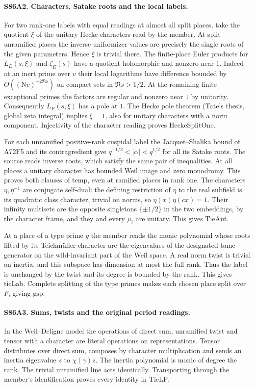 \paragraph{S86A2. Characters, Satake roots and the local labels.}
For two rank-one labels with equal readings at almost all split places,
take the quotient $\xi$ of the unitary Hecke characters read by the member.
At split unramified places the inverse uniformizer values are precisely
the single roots of the given parameters. Hence $\xi$ is trivial there.
The finite-place Euler products for $L_E(s,\xi)$ and $\zeta_E(s)$ have a
quotient holomorphic and nonzero near $1$. Indeed at an inert prime
over $v$ their local logarithms have difference bounded by
$O((\mathrm Nv)^{-2\Re s})$ on compact sets in $\Re s>1/2$.
At the remaining finite exceptional primes the factors are regular and
nonzero near $1$ by unitarity. Consequently $L_E(s,\xi)$ has a pole
at $1$. The Hecke pole theorem (Tate's thesis, global zeta integral)
implies $\xi=1$, also for unitary characters with a norm component.
Injectivity of the character reading proves $\mathrm{HeckeSplitOne}$.

For each unramified positive-rank cuspidal label the Jacquet--Shalika
bound of A72F5 and its contragredient give
$q^{-1/2}<|\alpha|<q^{1/2}$ for all its Satake roots. The source
reads inverse roots, which satisfy the same pair of inequalities.
At all places a unitary character has bounded Weil image and zero
monodromy. This proves both clauses of $\mathrm{temp}$, even at
ramified places in rank one. The characters $\eta,\eta^{-1}$ are
conjugate self-dual: the defining restriction of $\eta$ to the real
subfield is its quadratic class character, trivial on norms, so
$\eta(x)\eta(c x)=1$. Their infinity multisets are the opposite
singletons $\{\pm1/2\}$ in the two embeddings, by the character
frame, and they and every $\mu_i$ are unitary. This gives
$\mathrm{TieAut}$.

At a place of a type prime $g$ the member reads the monic polynomial
whose roots lifted by its Teichm\"uller character are the eigenvalues of
the designated tame generator on the wild-invariant part of the
Weil space. A real norm twist is trivial on inertia, and this subspace
has dimension at most the full rank. Thus the label is unchanged by
the twist and its degree is bounded by the rank. This gives
$\mathrm{tieLab}$. Complete splitting of the type primes makes each
chosen place split over $F$, giving $\mathrm{gsp}$.

\paragraph{S86A3. Sums, twists and the original period readings.}
In the Weil--Deligne model the operations of direct sum, unramified
twist and tensor with a character are literal operations on
representations. Tensor distributes over direct sum, composes by
character multiplication and sends an inertia eigenvalue $z$ to
$\chi(\gamma)z$. The inertia polynomial is monic of degree the rank.
The trivial unramified line acts identically. Transporting through the
member's identification proves every identity in $\mathrm{TieLP}$.

